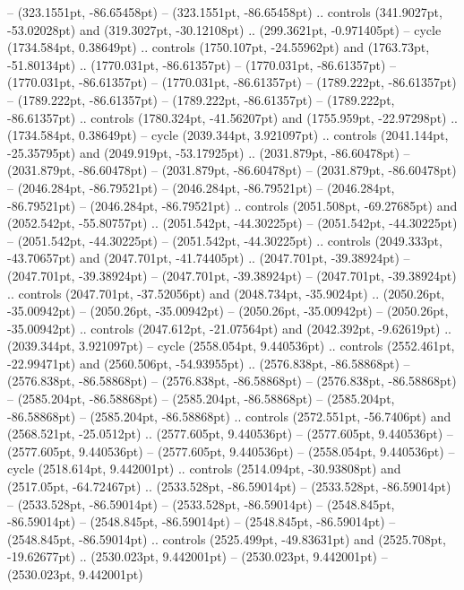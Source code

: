  -- (323.1551pt, -86.65458pt)
 -- (323.1551pt, -86.65458pt) .. controls (341.9027pt, -53.02028pt) and (319.3027pt, -30.12108pt) .. (299.3621pt, -0.971405pt) -- cycle
(1734.584pt, 0.38649pt) .. controls (1750.107pt, -24.55962pt) and (1763.73pt, -51.80134pt) .. (1770.031pt, -86.61357pt)
 -- (1770.031pt, -86.61357pt)
 -- (1770.031pt, -86.61357pt)
 -- (1770.031pt, -86.61357pt)
 -- (1789.222pt, -86.61357pt)
 -- (1789.222pt, -86.61357pt)
 -- (1789.222pt, -86.61357pt)
 -- (1789.222pt, -86.61357pt) .. controls (1780.324pt, -41.56207pt) and (1755.959pt, -22.97298pt) .. (1734.584pt, 0.38649pt) -- cycle
(2039.344pt, 3.921097pt) .. controls (2041.144pt, -25.35795pt) and (2049.919pt, -53.17925pt) .. (2031.879pt, -86.60478pt)
 -- (2031.879pt, -86.60478pt)
 -- (2031.879pt, -86.60478pt)
 -- (2031.879pt, -86.60478pt)
 -- (2046.284pt, -86.79521pt)
 -- (2046.284pt, -86.79521pt)
 -- (2046.284pt, -86.79521pt)
 -- (2046.284pt, -86.79521pt) .. controls (2051.508pt, -69.27685pt) and (2052.542pt, -55.80757pt) .. (2051.542pt, -44.30225pt)
 -- (2051.542pt, -44.30225pt)
 -- (2051.542pt, -44.30225pt)
 -- (2051.542pt, -44.30225pt) .. controls (2049.333pt, -43.70657pt) and (2047.701pt, -41.74405pt) .. (2047.701pt, -39.38924pt)
 -- (2047.701pt, -39.38924pt)
 -- (2047.701pt, -39.38924pt)
 -- (2047.701pt, -39.38924pt) .. controls (2047.701pt, -37.52056pt) and (2048.734pt, -35.9024pt) .. (2050.26pt, -35.00942pt)
 -- (2050.26pt, -35.00942pt)
 -- (2050.26pt, -35.00942pt)
 -- (2050.26pt, -35.00942pt) .. controls (2047.612pt, -21.07564pt) and (2042.392pt, -9.62619pt) .. (2039.344pt, 3.921097pt) -- cycle
(2558.054pt, 9.440536pt) .. controls (2552.461pt, -22.99471pt) and (2560.506pt, -54.93955pt) .. (2576.838pt, -86.58868pt)
 -- (2576.838pt, -86.58868pt)
 -- (2576.838pt, -86.58868pt)
 -- (2576.838pt, -86.58868pt)
 -- (2585.204pt, -86.58868pt)
 -- (2585.204pt, -86.58868pt)
 -- (2585.204pt, -86.58868pt)
 -- (2585.204pt, -86.58868pt) .. controls (2572.551pt, -56.7406pt) and (2568.521pt, -25.0512pt) .. (2577.605pt, 9.440536pt)
 -- (2577.605pt, 9.440536pt)
 -- (2577.605pt, 9.440536pt)
 -- (2577.605pt, 9.440536pt)
 -- (2558.054pt, 9.440536pt) -- cycle
(2518.614pt, 9.442001pt) .. controls (2514.094pt, -30.93808pt) and (2517.05pt, -64.72467pt) .. (2533.528pt, -86.59014pt)
 -- (2533.528pt, -86.59014pt)
 -- (2533.528pt, -86.59014pt)
 -- (2533.528pt, -86.59014pt)
 -- (2548.845pt, -86.59014pt)
 -- (2548.845pt, -86.59014pt)
 -- (2548.845pt, -86.59014pt)
 -- (2548.845pt, -86.59014pt) .. controls (2525.499pt, -49.83631pt) and (2525.708pt, -19.62677pt) .. (2530.023pt, 9.442001pt)
 -- (2530.023pt, 9.442001pt)
 -- (2530.023pt, 9.442001pt)
